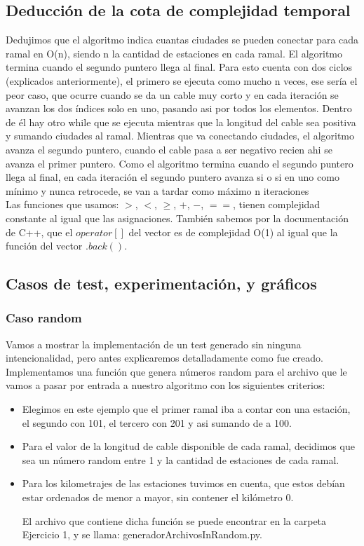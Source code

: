 \subsection{Deducción de la cota de complejidad temporal}

Dedujimos que el algoritmo indica cuantas ciudades se pueden conectar para cada ramal en O(n), siendo n la cantidad de estaciones en cada ramal. El algoritmo termina cuando el segundo puntero llega al final. Para esto cuenta con dos ciclos (explicados anteriormente), el primero se ejecuta como mucho n veces, ese sería el peor caso, que ocurre cuando se da un cable muy corto y en cada iteración se avanzan los dos índices solo en uno, pasando asi por todos los elementos. Dentro de él hay otro while que se ejecuta mientras que la longitud del cable sea positiva y sumando ciudades al ramal. Mientras que va conectando ciudades, el algoritmo avanza el segundo puntero, cuando el cable pasa a ser negativo recien ahi se avanza el primer puntero. Como el algoritmo termina cuando el segundo puntero llega al final, en cada iteración el segundo puntero avanza si o si en uno como mínimo y nunca retrocede, se van a tardar como máximo n iteraciones \\

Las funciones que usamos: $>$, $<$, $\geq$, $+$, $-$, $==$, tienen complejidad constante al igual que las asignaciones. También sabemos por la documentación de C++, que el $operator[]$ del vector es de complejidad O(1) al igual que la función del vector $.back()$.\\

\subsection{Casos de test, experimentación, y gráficos}

\subsubsection{Caso random}
Vamos a mostrar la implementación de un test generado sin ninguna intencionalidad, pero antes explicaremos detalladamente como fue creado. \\

Implementamos una función que genera números random para el archivo que le vamos a pasar por entrada a nuestro algoritmo con los siguientes criterios:
\begin{itemize}
\item Elegimos en este ejemplo que el primer ramal iba a contar con una estación, el segundo con 101, el tercero con 201 y asi sumando de a 100.
\item Para el valor de la longitud de cable disponible de cada ramal, decidimos que sea un número random entre 1 y la cantidad de estaciones de cada ramal.
\item Para los kilometrajes de las estaciones tuvimos en cuenta, que estos debían estar ordenados de menor a mayor, sin contener el kilómetro 0. 

El archivo que contiene dicha función se puede encontrar en la carpeta Ejercicio 1, y se llama: generadorArchivosInRandom.py.

\end{itemize}

